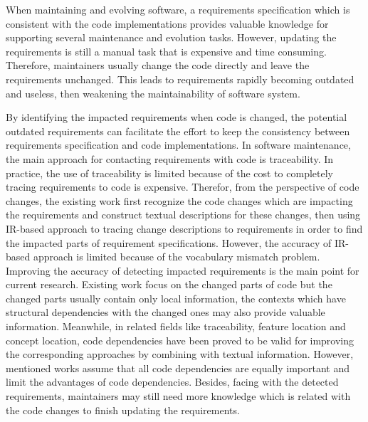 \documentclass[twoside, master]{NJUthesis}
\theoremstyle{plain}
\begin{document}
\begin{englishabstract}

When maintaining and evolving software, a requirements specification which is consistent with the code implementations provides valuable knowledge for supporting several maintenance and evolution tasks. However, updating the requirements is still a manual task that is expensive and time consuming. Therefore, maintainers usually change the code directly and leave the requirements unchanged. This leads to requirements rapidly becoming outdated and useless, then weakening the maintainability of software system. 

By identifying the impacted requirements when code is changed, the potential outdated requirements can facilitate the effort to keep the consistency between requirements specification and code implementations. In software maintenance, the main approach for contacting requirements with code is traceability. In practice, the use of traceability is limited because of the cost to completely tracing requirements to code is expensive. Therefor, from the perspective of code changes, the existing work first recognize the code changes which are impacting the requirements and construct textual descriptions for these changes, then using IR-based approach to tracing change descriptions to requirements in order to find the impacted parts of requirement specifications. However, the accuracy of IR-based approach is limited because of the vocabulary mismatch problem. Improving the accuracy of detecting impacted requirements is the main point for current research. Existing work focus on the changed parts of code but the changed parts usually contain only local information, the contexts which have structural dependencies with the changed ones may also provide valuable information. Meanwhile, in related fields like traceability, feature location and concept location, code dependencies have been proved to be valid for improving the corresponding approaches by combining with textual information. However, mentioned works assume that all code dependencies are equally important and limit the advantages of code dependencies. Besides, facing with the detected requirements, maintainers may still need more knowledge which is related with the code changes to finish updating the requirements.


\end{englishabstract}
\end{document}
